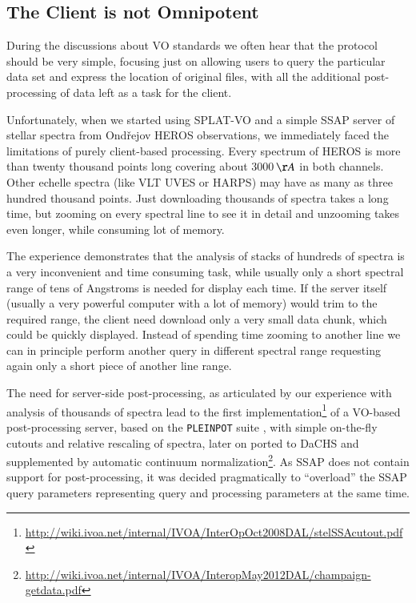 \documentclass[final,authoryear,5p,times,twocolumn]{elsarticle}
\begin{document}
\subsection{The Client is not Omnipotent}

During the discussions about VO standards we often hear that the
protocol should be very simple, focusing just on allowing users to
query the particular data set and express the location of original
files, with all the additional post-processing of data left as a task
for the client.

Unfortunately, when we started using SPLAT-VO and a simple SSAP server
of stellar spectra from Ond\v{r}ejov HEROS observations, we
immediately faced the limitations of purely client-based
processing. Every spectrum of HEROS is more than twenty thousand
points long covering about 3000\,$\AA$ in both channels. Other echelle
spectra (like VLT UVES or HARPS) may have as many as three hundred
thousand points. Just downloading thousands of spectra takes a long
time, but zooming on every spectral line to see it in detail and
unzooming takes even longer, while consuming lot of memory.

The experience demonstrates that the analysis of stacks of hundreds of
spectra is a very inconvenient and time consuming task, while usually
only a short spectral range of tens of Angstroms is needed for display
each time.  If the server itself (usually a very powerful computer
with a lot of memory) would trim to the required range, the client
need download only a very small data chunk, which could be quickly
displayed. Instead of spending time zooming to another line we can in
principle perform another query in different spectral range requesting
again only a short piece of another line range.

The need for server-side post-processing, as articulated by our
experience with analysis of thousands of spectra lead to the first
implementation\footnote{\url{http://wiki.ivoa.net/internal/IVOA/InterOpOct2008DAL/stelSSAcutout.pdf}}
of a VO-based post-processing server, based on the \texttt{PLEINPOT} suite
\citep{2005ASPC..347..385C}, with simple on-the-fly cutouts and
relative rescaling of spectra, later on ported to DaCHS and
supplemented by automatic continuum
normalization\footnote{\url{http://wiki.ivoa.net/internal/IVOA/InteropMay2012DAL/champaign-getdata.pdf}}.
As SSAP does not contain support for post-processing, it was decided
pragmatically to ``overload'' the SSAP query parameters representing
query and processing parameters at the same time.
\end{document}
